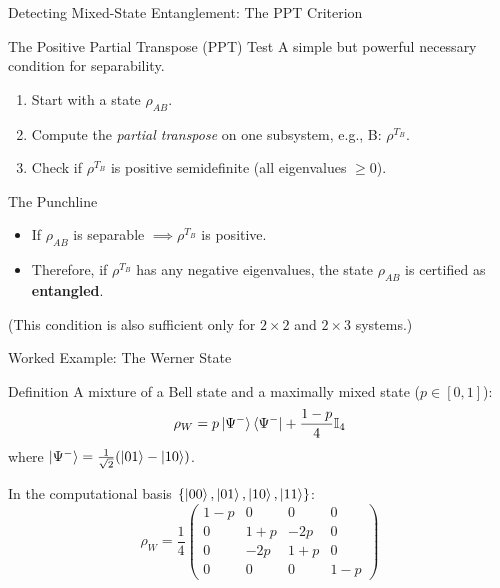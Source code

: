 \begin{frame}{Detecting Mixed-State Entanglement: The PPT Criterion}
  \begin{block}{The Positive Partial Transpose (PPT) Test}
    A simple but powerful necessary condition for separability.
    \begin{enumerate}
      \item<1-> Start with a state $\rho_{AB}$.
      \pause
      \item<2-> Compute the \emph{partial transpose} on one subsystem, e.g., B:
        $\rho^{T_B}$.
      \pause
      \item<3-> Check if $\rho^{T_B}$ is positive semidefinite (all
        eigenvalues $\ge 0$).
    \end{enumerate}
  \end{block}
  \pause
  \begin{alertblock}{The Punchline}
    \begin{itemize}
        \item If $\rho_{AB}$ is separable $\implies \rho^{T_B}$ is positive.
        \pause
        \item Therefore, if $\rho^{T_B}$ has any \alert{negative eigenvalues},
        the state $\rho_{AB}$ is certified as \textbf{entangled}.
    \end{itemize}
    \footnotesize{(This condition is also sufficient only for $2\times2$ and
    $2\times3$ systems.)}
  \end{alertblock}
\end{frame}

\begin{frame}{Worked Example: The Werner State}
  \begin{block}{Definition}
    A mixture of a Bell state and a maximally mixed state ($p \in [0, 1]$):
    \[ \rho_W = p \ket{\Psi^-}\bra{\Psi^-} + \frac{1-p}{4} \mathbb{I}_4 \]
    where $\ket{\Psi^-} = \frac{1}{\sqrt{2}}(\ket{01}-\ket{10})$.
    \pause

    In the computational basis $\{\ket{00}, \ket{01}, \ket{10}, \ket{11}\}$:
    \[
      \rho_W = \frac{1}{4}
      \begin{pmatrix}
        1-p & 0 & 0 & 0 \\
        0 & 1+p & -2p & 0 \\
        0 & -2p & 1+p & 0 \\
        0 & 0 & 0 & 1-p
      \end{pmatrix}
    \]
  \end{block}
\end{frame}

